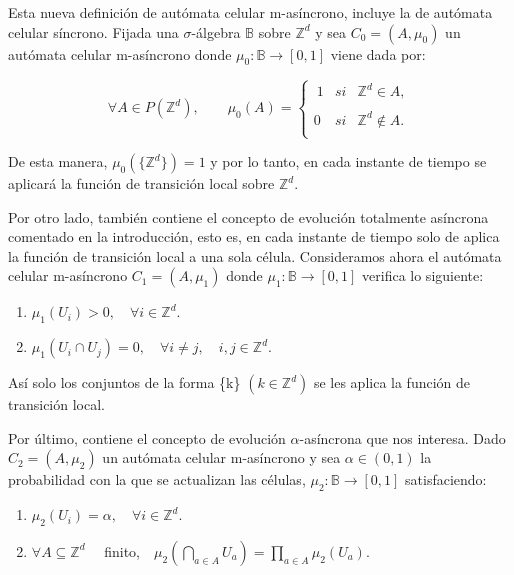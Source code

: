 \documentclass[../proyecto.tex]{memoir}
\begin{document}
Esta nueva definición de autómata celular m-asíncrono, incluye la de autómata celular síncrono. Fijada una $\sigma$-álgebra $\mathds{B}$ sobre $\mathds{Z}^{d}$ y sea $C_{0}=(A, \mu_{0})$ un autómata celular m-asíncrono donde $\mu_{0}: \mathds{B} \rightarrow [0,1]$ viene dada por: 

\begin{equation*}
	 \forall A \in P(\mathds{Z}^{d}), \qquad 
	 \mu_{0}(A) = \left\{ \begin{array}{lcc}
             \ 1 &   si  & \mathds{Z}^{d} \in A ,\\
             \\0 &   si  & \mathds{Z}^{d} \notin A .\\
             \end{array}
             \right.
\end{equation*}

De esta manera, $\mu_{0}(\{\mathds{Z}^{d}\})=1$ y por lo tanto, en cada instante de tiempo se aplicará la función de transición local sobre $\mathds{Z}^{d}$.

Por otro lado, también contiene el concepto de evolución totalmente asíncrona comentado en la introducción, esto es, en cada instante de tiempo solo de aplica la función de transición local a una sola célula. Consideramos ahora el autómata celular m-asíncrono $C_{1}=(A, \mu_{1})$ donde $\mu_{1}: \mathds{B} \rightarrow [0,1]$ verifica lo siguiente:

\begin{enumerate}
\item $\mu_{1}(U_{i}) > 0, \quad \forall i \in \mathds{Z}^{d}$.
\item $\mu_{1}(U_{i} \cap U_{j}) = 0, \quad \forall i \neq j, \quad i,j \in \mathds{Z}^{d}$.
\end{enumerate}

Así solo los conjuntos de la forma \{k\} $(k \in \mathds{Z}^{d})$ se les aplica la función de transición local.

Por último, contiene el concepto de evolución $\alpha$-asíncrona que nos interesa. Dado $C_{2}=(A, \mu_{2})$ un autómata celular m-asíncrono y sea $\alpha \in (0,1)$ la probabilidad con la que se actualizan las células, $\mu_{2}: \mathds{B} \rightarrow [0,1]$ satisfaciendo:

\begin{enumerate}
\item $\mu_{2}(U_{i}) = \alpha, \quad \forall i \in \mathds{Z}^{d}$.
\item $ \forall A \subseteq \mathds{Z}^{d} \quad$ finito,$\quad  \mu_{2} ( \bigcap_{a \in A} U_{a} ) = \prod_{a \in A} \mu_{2} ( U_{a} )$.
\end{enumerate}
\end{document}

